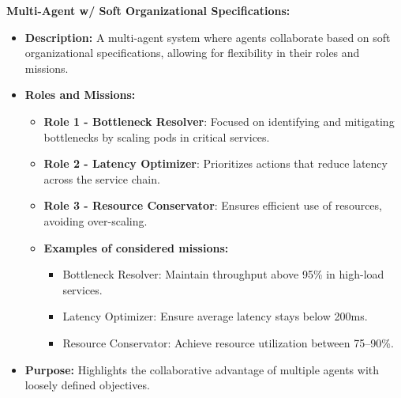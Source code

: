 \documentclass[conference]{IEEEtran}
\begin{document}
\noindent \textbf{Multi-Agent w/ Soft Organizational Specifications:}
\begin{itemize}
    \item \textbf{Description:} A multi-agent system where agents collaborate based on soft organizational specifications, allowing for flexibility in their roles and missions.
    \item \textbf{Roles and Missions:}
    \begin{itemize}
        \item \textbf{Role 1 - Bottleneck Resolver}: Focused on identifying and mitigating bottlenecks by scaling pods in critical services.
        \item \textbf{Role 2 - Latency Optimizer}: Prioritizes actions that reduce latency across the service chain.
        \item \textbf{Role 3 - Resource Conservator}: Ensures efficient use of resources, avoiding over-scaling.
        \item \textbf{Examples of considered missions:}
        \begin{itemize}
            \item Bottleneck Resolver: Maintain throughput above 95\% in high-load services.
            \item Latency Optimizer: Ensure average latency stays below 200ms.
            \item Resource Conservator: Achieve resource utilization between 75–90\%.
        \end{itemize}
    \end{itemize}
    \item \textbf{Purpose:} Highlights the collaborative advantage of multiple agents with loosely defined objectives.
\end{itemize}

\
\end{document}

